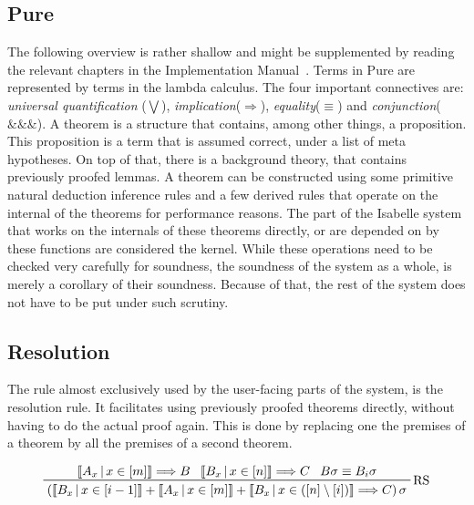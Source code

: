\subsection{Pure}
The following overview is rather shallow and might be supplemented by reading the relevant chapters in the Implementation Manual~\parencite{implementation}. Terms in Pure are represented by terms in the lambda calculus. The four important connectives are: \textit{universal quantification} ($\bigvee$), \textit{implication}($\Longrightarrow$), \textit{equality}($\equiv$) and \textit{conjunction}($\&\&\&$).
A theorem is a structure that contains, among other things, a proposition. This proposition is a term that is assumed correct, under a list of meta hypotheses. On top of that, there is a background theory, that contains previously proofed lemmas. A theorem can be constructed using some primitive natural deduction inference rules and a few derived rules that operate on the internal of the theorems for performance reasons.
The part of the Isabelle system that works on the internals of these theorems directly, or are depended on by these functions are considered the kernel. While these operations need to be checked very carefully for soundness, the soundness of the system as a whole, is merely a corollary of their soundness. Because of that, the rest of the system does not have to be put under such scrutiny.
\subsection{Resolution}
The rule almost exclusively used by the user-facing parts of the system, is the resolution rule. It facilitates using previously proofed theorems directly, without having to do the actual proof again. This is done by replacing one the premises of a theorem by all the premises of a second theorem.

\begin{displaymath}
    \prftree[r]{RS}
    {\left\llbracket A_x\,\middle|\, x \in \left[ m \right] \right\rrbracket \Longrightarrow B}
    {\left\llbracket B_x\,\middle|\, x \in \left[ n \right] \right\rrbracket \Longrightarrow C}
    {B\sigma \equiv B_i\sigma}
    {\left( \left\llbracket B_x\,\middle|\, x \in \left[ i - 1 \right] \right\rrbracket
    + \left\llbracket A_x\,\middle|\, x \in \left[ m \right] \right\rrbracket
    + \left\llbracket B_x\,\middle|\, x \in \left( \left[ n \right] \setminus \left[ i \right] \right) \right\rrbracket
    \Longrightarrow C \right) \sigma
    }
\end{displaymath}


